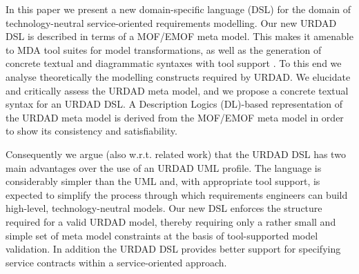 In this paper we present a new domain-specific language (DSL) for the domain of technology-neutral service-orien\-ted requirements modelling. Our new URDAD DSL is described in terms of a MOF/EMOF meta model. This makes it amenable to MDA tool suites for model transformations, as well as the generation of concrete textual and diagrammatic syntaxes with tool support \cite{gronback_model_2008}. To this end we analyse theoretically the modelling constructs required by URDAD. We elucidate and critically assess the URDAD meta model, and we propose a concrete textual syntax for an URDAD DSL. A Description Logics (DL)-based representation of the URDAD meta model is derived from the MOF/EMOF meta model in order to show its consistency and satisfiability.

Consequently we argue (also w.r.t. related work) that the URDAD DSL has two main advantages over the use of an URDAD UML profile. The language is considerably simpler than the UML and, with appropriate tool support, is expected to simplify the process through which requirements engineers can build high-level, technology-neutral models. Our new DSL enforces the structure required for a valid URDAD model, thereby requiring only a rather small and simple set of meta model constraints at the basis of tool-supported model validation. In addition the URDAD DSL provides better support for specifying service contracts within a service-oriented approach.

